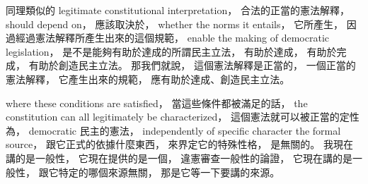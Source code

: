 \hypertarget{w02:cue:221}{}同理類似的 legitimate constitutional interpretation，
\hypertarget{w02:cue:222}{}合法的正當的憲法解釋，
\hypertarget{w02:cue:223}{}should depend on，
\hypertarget{w02:cue:224}{}應該取決於，
\hypertarget{w02:cue:225}{}whether the norms it entails，
\hypertarget{w02:cue:226}{}它所產生，
\hypertarget{w02:cue:227}{}因過經過憲法解釋所產生出來的這個規範，
\hypertarget{w02:cue:228}{}enable the making of democratic legislation，
\hypertarget{w02:cue:229}{}是不是能夠有助於達成的所謂民主立法，
\hypertarget{w02:cue:230}{}有助於達成，
\hypertarget{w02:cue:231}{}有助於完成，
\hypertarget{w02:cue:232}{}有助於創造民主立法。
\hypertarget{w02:cue:233}{}那我們就說，
\hypertarget{w02:cue:234}{}這個憲法解釋是正當的，
\hypertarget{w02:cue:235}{}一個正當的憲法解釋，
\hypertarget{w02:cue:236}{}它產生出來的規範，
\hypertarget{w02:cue:237}{}應有助於達成、創造民主立法。

\hypertarget{w02:cue:238}{}where these conditions are satisfied，
\hypertarget{w02:cue:239}{}當這些條件都被滿足的話，
\hypertarget{w02:cue:240}{}the constitution can all legitimately be characterized，
\hypertarget{w02:cue:241}{}這個憲法就可以被正當的定性為，
\hypertarget{w02:cue:242}{}democratic 民主的憲法，
\hypertarget{w02:cue:243}{}independently of specific character
\hypertarget{w02:cue:244}{}the formal source，
\hypertarget{w02:cue:245}{}跟它正式的依據什麼東西，
\hypertarget{w02:cue:246}{}來界定它的特殊性格，
\hypertarget{w02:cue:247}{}是無關的。
\hypertarget{w02:cue:248}{}我現在講的是一般性，
\hypertarget{w02:cue:249}{}它現在提供的是一個，
\hypertarget{w02:cue:250}{}違憲審查一般性的論證，
\hypertarget{w02:cue:251}{}它現在講的是一般性，
\hypertarget{w02:cue:252}{}跟它特定的哪個來源無關，
\hypertarget{w02:cue:253}{}那是它等一下要講的來源。

